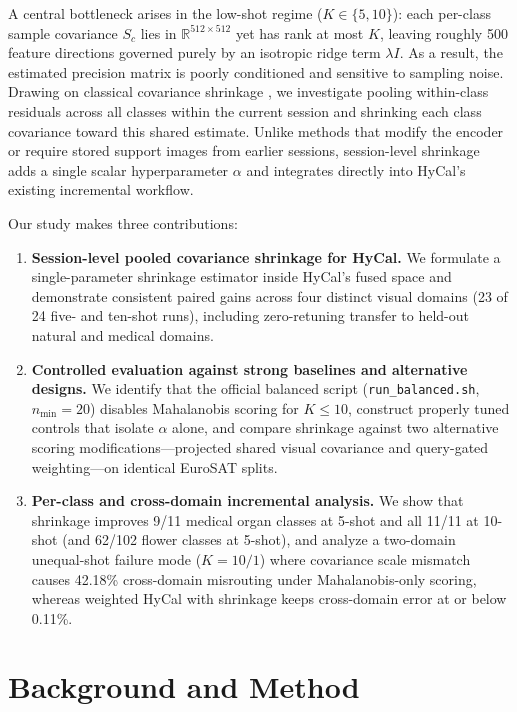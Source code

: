 \documentclass[letterpaper]{article} %
\newcommand{\nmin}{n_{\min}}
\begin{document}
A central bottleneck arises in the low-shot regime ($K \in \{5, 10\}$): each per-class sample covariance $S_c$ lies in $\mathbb{R}^{512 \times 512}$ yet has rank at most $K$, leaving roughly 500 feature directions governed purely by an isotropic ridge term $\lambda I$. As a result, the estimated precision matrix is poorly conditioned and sensitive to sampling noise. Drawing on classical covariance shrinkage \citep{friedman1989,ledoit2004}, we investigate pooling within-class residuals across all classes within the current session and shrinking each class covariance toward this shared estimate. Unlike methods that modify the encoder or require stored support images from earlier sessions, session-level shrinkage adds a single scalar hyperparameter $\alpha$ and integrates directly into HyCal's existing incremental workflow.

Our study makes three contributions:
\begin{enumerate}
\item \textbf{Session-level pooled covariance shrinkage for HyCal.} We formulate a single-parameter shrinkage estimator inside HyCal's fused space and demonstrate consistent paired gains across four distinct visual domains (23 of 24 five- and ten-shot runs), including zero-retuning transfer to held-out natural and medical domains.
\item \textbf{Controlled evaluation against strong baselines and alternative designs.} We identify that the official balanced script (\texttt{run\_balanced.sh}, $\nmin = 20$) disables Mahalanobis scoring for $K \le 10$, construct properly tuned controls that isolate $\alpha$ alone, and compare shrinkage against two alternative scoring modifications---projected shared visual covariance and query-gated weighting---on identical EuroSAT splits.
\item \textbf{Per-class and cross-domain incremental analysis.} We show that shrinkage improves 9/11 medical organ classes at 5-shot and all 11/11 at 10-shot (and 62/102 flower classes at 5-shot), and analyze a two-domain unequal-shot failure mode ($K = 10/1$) where covariance scale mismatch causes 42.18\% cross-domain misrouting under Mahalanobis-only scoring, whereas weighted HyCal with shrinkage keeps cross-domain error at or below 0.11\%.
\end{enumerate}

\section{Background and Method}
\end{document}
